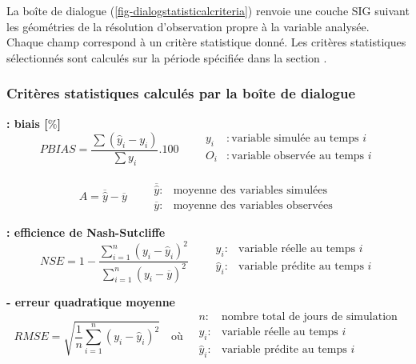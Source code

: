 La boîte de dialogue  (\cref{fig-dialogstatisticalcriteria}) renvoie une couche SIG suivant les géométries de la résolution d'observation propre à la variable analysée. Chaque champ correspond à un critère statistique donné. Les critères statistiques sélectionnés sont calculés sur la période spécifiée dans la section .\\

\subsubsection*{Critères statistiques calculés par la boîte de dialogue }

\textbf{ : biais [$\%$]}
\begin{equation*}
PBIAS = \frac{\sum(\hat{y}_i -y_i)}{\sum y_i} . 100
\quad \quad
\begin{array}{rl}

      y_i & : \text{variable simulée au temps $i$}\\
      O_i & : \text{variable observée au temps $i$}\\
\end{array}
\end{equation*}

\textbf{}
\begin{equation*}
    A = \overline{\hat{y}} - \overline{y}
    \quad\quad
    \begin{array}{cc}
         \overline{\hat{y}} :& \text{moyenne des variables simulées} \\
         \overline{y} : & \text{moyenne des variables observées}
    \end{array}
\end{equation*}

\textbf{ : efficience de Nash-Sutcliffe} \citep{nash1970}
\begin{equation*}
    NSE = 1 - \frac{\sum_{i=1}^n (y_i - \hat{y}_i)^2}{\sum_{i=1}^n (y_i - \overline{y})^2}
    \quad \quad
    \begin{array}{ll}
         y_i :& \text{variable réelle au temps } i \\
        \hat{y}_i :& \text{variable prédite au temps } i \\
    \end{array}
\end{equation*}

\textbf{ - erreur quadratique moyenne}
\begin{equation*}
RMSE = \sqrt{\frac{1}{n} \sum_{i=1}^{n} (y_i - \hat{y}_i)^2}
\quad \text{où} \quad
\begin{array}{ll}
    n :& \text{nombre total de jours de simulation} \\
    y_i :& \text{variable réelle au temps } i \\
    \hat{y}_i :& \text{variable prédite au temps } i \\
\end{array}
\end{equation*}

